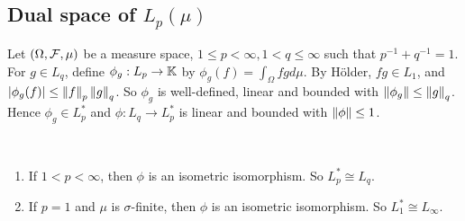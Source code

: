 \documentclass{article}
\begin{document}
\subsection{Dual space of \texorpdfstring{$L_p(\mu)$}{Lp(mu)}}

Let $(\Omega, \mathcal F, \mu)$ be a measure space, $1 \le p < \infty, 1 < q \le \infty$ such that $p^{-1} + q^{-1} = 1$. For $g \in L_q$, define $\phi_g : L_p \to \mathbb K$ by $\phi_g(f) = \int_\Omega fg d\mu$. By Hölder, $fg \in L_1$, and $\left\lvert \phi_g(f)\right\rvert \le \left\lVert f\right\rVert_p \left\lVert g\right\rVert_q$. So $\phi_g$ is well-defined, linear and bounded with $\left\lVert \phi_g\right\rVert \le \left\lVert g\right\rVert_q$. Hence $\phi_g \in L_p^*$ and $\phi : L_q \to L_p^*$ is linear and bounded with $\left\lVert \phi\right\rVert \le 1$.

\begin{thm}\label{thm:lp-dual}~
  \begin{enumerate}
    \item If $1 < p < \infty$, then $\phi$ is an isometric isomorphism. So $L_p^* \cong L_q$.
    \item If $p = 1$ and $\mu$ is $\sigma$-finite, then $\phi$ is an isometric isomorphism. So $L_1^* \cong L_\infty$.
  \end{enumerate}
\end{thm}
\end{document}
